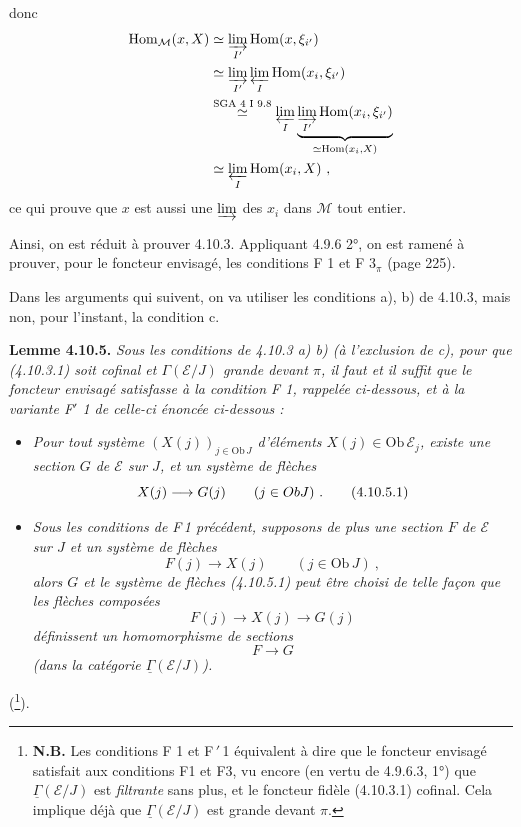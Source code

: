 \documentclass[11pt]{article}
\newcommand{\printedpage}[1]{\marginpar{\footnotesize p.~#1}}
\newcommand{\msp}[1]{\marginpar{\footnotesize [#1]}}
\newcommand{\uGamma}{\underline{\Gamma}}
\newcommand{\Hom}{\operatorname{Hom}}
\newcommand{\Ob}{\mathrm{Ob}\,}
\begin{document}
\printedpage{94}
donc
\[
\begin{aligned}
\Hom_{\mathcal{M}}(x,X) &\simeq \varinjlim_{I'} \Hom(x,\xi_{i'})\\
&\simeq \varinjlim_{I'} \varprojlim_{I} \Hom(x_i,\xi_{i'})\\
&\overset{\text{SGA 4 I 9.8}}{\simeq} \varprojlim_{I} \underbrace{\varinjlim_{I'} \Hom(x_i,\xi_{i'})}_{\simeq \Hom(x_i,X)}\\
&\simeq \varprojlim_{I} \Hom(x_i,X)\ ,
\end{aligned}
\]
ce qui prouve que $x$ est aussi une $\varinjlim$ des $x_i$ dans $\mathcal{M}$ tout entier.

\msp{250}
Ainsi, on est réduit à prouver 4.10.3. Appliquant 4.9.6 2°, on est ramené à prouver, pour le foncteur envisagé, les conditions F 1 et F $3_\pi$ (page 225).

Dans les arguments qui suivent, on va utiliser les conditions a), b) de 4.10.3, mais non, pour l'instant, la condition c.

\textbf{Lemme 4.10.5.} \textit{Sous les conditions de 4.10.3 a) b) (à l'exclusion de c), pour que (4.10.3.1) soit cofinal et $\Gamma(\mathcal{E}/J)$ grande devant $\pi$, il faut et il suffit que le foncteur envisagé satisfasse à la condition F 1, rappelée ci-dessous, et à la variante F$'$ 1 de celle-ci énoncée ci-dessous :}
\begin{itemize}[leftmargin=3em]
\item[F\,1)] {\itshape Pour tout système $(X(j))_{j\in\Ob J}$ d'éléments $X(j)\in\Ob\mathcal{E}_j$, existe une \textup{section} $G$ de $\mathcal{E}$ sur $J$, et un système de flèches
\[
X(j) \longrightarrow G(j) \qquad (j\in ObJ)\ . \tag*{\textup{(4.10.5.1)}}
\]}
\item[F$'$1)] {\itshape Sous les conditions de \textup{F\,1} précédent, supposons de plus une section $F$ de $\mathcal{E}$ sur $J$ \msp{251} et un système de flèches
\[
F(j) \longrightarrow X(j) \qquad (j\in\Ob J)\ ,
\]
alors $G$ et le système de flèches (4.10.5.1) peut être choisi de telle façon que les flèches composées
\[
F(j) \longrightarrow X(j) \longrightarrow G(j)
\]
définissent un homomorphisme de sections
\[
F \longrightarrow G
\]
(dans la catégorie $\uGamma(\mathcal{E}/J)$).}
\end{itemize}
(\footnote[106]{\textbf{N.B.} Les conditions F 1 et F$\,'$\,1 équivalent à dire que le foncteur envisagé satisfait aux conditions F1 et F3, vu encore (en vertu de 4.9.6.3, 1°) que $\uGamma(\mathcal{E}/J)$ est \textit{filtrante} sans plus, et le foncteur fidèle (4.10.3.1) cofinal. Cela implique déjà que $\uGamma(\mathcal{E}/J)$ est grande devant $\pi$.}).
\end{document}
